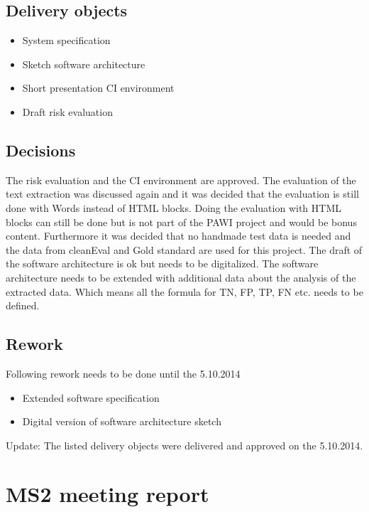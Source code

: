 \subsection{Delivery objects}

\begin{itemize}
\item System specification
\item Sketch software architecture
\item Short presentation CI environment
\item Draft risk evaluation
\end{itemize}

\subsection{Decisions}

The risk evaluation and the CI environment are approved. 
The evaluation of the text extraction was discussed again and it was decided that the evaluation is still done with Words instead of HTML blocks. Doing the evaluation with HTML blocks can still be done but is not part of the PAWI project and would be bonus content. 
Furthermore it was decided that no handmade test data is needed and the data from cleanEval and Gold standard are used for this project.
The draft of the software architecture is ok but needs to be digitalized.
The software architecture needs to be extended with additional data about the analysis of the extracted data. Which means all the formula for TN, FP, TP, FN etc. needs to be defined.


\subsection{Rework}

Following rework needs to be done until the 5.10.2014

\begin{itemize}
\item Extended software specification
\item Digital version of software architecture sketch
\end{itemize}

Update: The listed delivery objects were delivered and approved on the 5.10.2014.


\section{MS2 meeting report}

